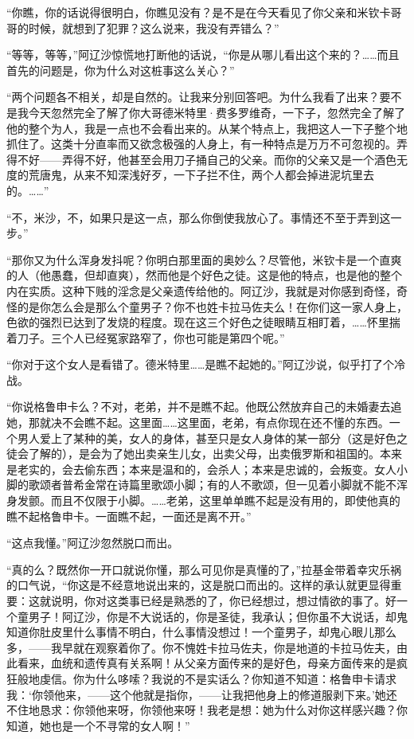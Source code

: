 \par “你瞧，你的话说得很明白，你瞧见没有？是不是在今天看见了你父亲和米钦卡哥哥的时候，就想到了犯罪？这么说来，我没有弄错么？”
\par “等等，等等，”阿辽沙惊慌地打断他的话说，“你是从哪儿看出这个来的？……而且首先的问题是，你为什么对这桩事这么关心？”
\par “两个问题各不相关，却是自然的。让我来分别回答吧。为什么我看了出来？要不是我今天忽然完全了解了你大哥德米特里·费多罗维奇，一下子，忽然完全了解了他的整个为人，我是一点也不会看出来的。从某个特点上，我把这人一下子整个地抓住了。这类十分直率而又欲念极强的人身上，有一种特点是万万不可忽视的。弄得不好——弄得不好，他甚至会用刀子捅自己的父亲。而你的父亲又是一个酒色无度的荒唐鬼，从来不知深浅好歹，一下子拦不住，两个人都会掉进泥坑里去的。……”
\par “不，米沙，不，如果只是这一点，那么你倒使我放心了。事情还不至于弄到这一步。”
\par “那你又为什么浑身发抖呢？你明白那里面的奥妙么？尽管他，米钦卡是一个直爽的人（他愚蠢，但却直爽），然而他是个好色之徒。这是他的特点，也是他的整个内在实质。这种下贱的淫念是父亲遗传给他的。阿辽沙，我就是对你感到奇怪，奇怪的是你怎么会是那么个童男子？你不也姓卡拉马佐夫么！在你们这一家人身上，色欲的强烈已达到了发烧的程度。现在这三个好色之徒眼睛互相盯着，……怀里揣着刀子。三个人已经冤家路窄了，你也可能是第四个呢。”
\par “你对于这个女人是看错了。德米特里……是瞧不起她的。”阿辽沙说，似乎打了个冷战。
\par “你说格鲁申卡么？不对，老弟，并不是瞧不起。他既公然放弃自己的未婚妻去追她，那就决不会瞧不起。这里面……这里面，老弟，有点你现在还不懂的东西。一个男人爱上了某种的美，女人的身体，甚至只是女人身体的某一部分（这是好色之徒会了解的），是会为了她出卖亲生儿女，出卖父母，出卖俄罗斯和祖国的。本来是老实的，会去偷东西；本来是温和的，会杀人；本来是忠诚的，会叛变。女人小脚的歌颂者普希金常在诗篇里歌颂小脚；有的人不歌颂，但一见着小脚就不能不浑身发颤。而且不仅限于小脚。……老弟，这里单单瞧不起是没有用的，即使他真的瞧不起格鲁申卡。一面瞧不起，一面还是离不开。”
\par “这点我懂。”阿辽沙忽然脱口而出。
\par “真的么？既然你一开口就说你懂，那么可见你是真懂的了，”拉基金带着幸灾乐祸的口气说，“你这是不经意地说出来的，这是脱口而出的。这样的承认就更显得重要：这就说明，你对这类事已经是熟悉的了，你已经想过，想过情欲的事了。好一个童男子！阿辽沙，你是不大说话的，你是圣徒，我承认；但你虽不大说话，却鬼知道你肚皮里什么事情不明白，什么事情没想过！一个童男子，却鬼心眼儿那么多，——我早就在观察着你了。你不愧姓卡拉马佐夫，你是地道的卡拉马佐夫，由此看来，血统和遗传真有关系啊！从父亲方面传来的是好色，母亲方面传来的是疯狂般地虔信。你为什么哆嗦？我说的不是实话么？你知道不知道：格鲁申卡请求我：‘你领他来，——这个他就是指你，——让我把他身上的修道服剥下来。’她还不住地恳求：你领他来呀，你领他来呀！我老是想：她为什么对你这样感兴趣？你知道，她也是一个不寻常的女人啊！”
